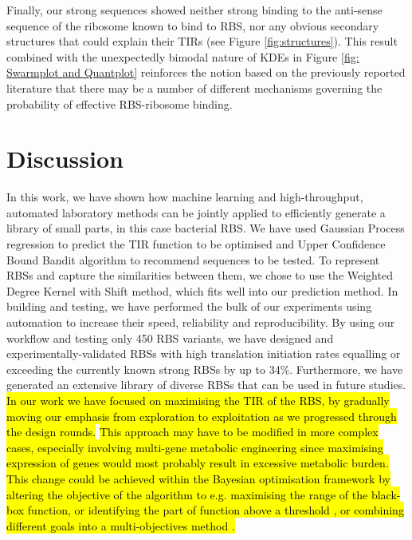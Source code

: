 \documentclass{article}
\begin{document}
Finally, our strong sequences showed neither strong binding to the anti-sense sequence of the ribosome known to bind to RBS, nor any obvious secondary structures that could explain their TIRs (see Figure \ref{fig:structures}).
This result combined with the unexpectedly bimodal nature of KDEs in Figure \ref{fig: Swarmplot and Quantplot} reinforces the notion based on the previously reported literature \cite{Saito2020,EspahBorujeni2016} that there may be a number of different mechanisms governing the probability of effective RBS-ribosome binding.\\


\section{Discussion}

In this work, we have shown how machine learning and high-throughput, automated laboratory methods can be jointly applied to efficiently generate a library of small parts, in this case bacterial RBS. 
We have used Gaussian Process regression to predict the TIR function to be optimised and Upper Confidence Bound Bandit algorithm to recommend sequences to be tested.
To represent RBSs and capture the similarities between them, we chose to use the
Weighted Degree Kernel with Shift method, which fits well into our prediction method.
In building and testing, we have performed the bulk of our experiments using automation to increase their speed, reliability and reproducibility.
By using our workflow and testing only 450 RBS variants, we have designed and experimentally-validated RBSs with high translation initiation rates equalling or exceeding the currently known strong RBSs by up to 34\%.
Furthermore, we have generated an extensive library of diverse RBSs that can be used in future studies.\\

\hl{In our work we have focused on maximising the TIR of the RBS, by gradually moving our emphasis from exploration to exploitation as we progressed through the design rounds.}
\hl{This approach may have to be modified in more complex cases, especially involving multi-gene metabolic engineering since maximising expression of genes would most probably result in excessive metabolic burden.}
\hl{This change could be achieved within the Bayesian optimisation framework by altering the objective of the algorithm to e.g. maximising the range of the black-box function, or identifying the part of function above a threshold \mbox{\cite{gotovos2013active}}, or combining different goals into a multi-objectives method \mbox{\cite{shu2020new}}.}\\
\end{document}
